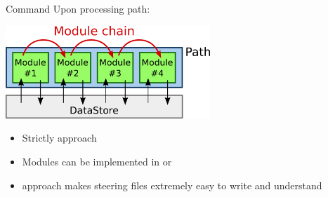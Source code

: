 \begin{frame}{Command}
	Upon processing path:
	\begin{center}
	\includegraphics[height=3.5cm]{figures/patterns/behavioral/ModulePath.png}
	\end{center}
	
	\bigskip
	\begin{itemize}
		\item Strictly  approach 
		\item Modules can be implemented in  or 
		\item {} approach makes steering files extremely easy to write and understand 
	\end{itemize}
\end{frame}

%	

